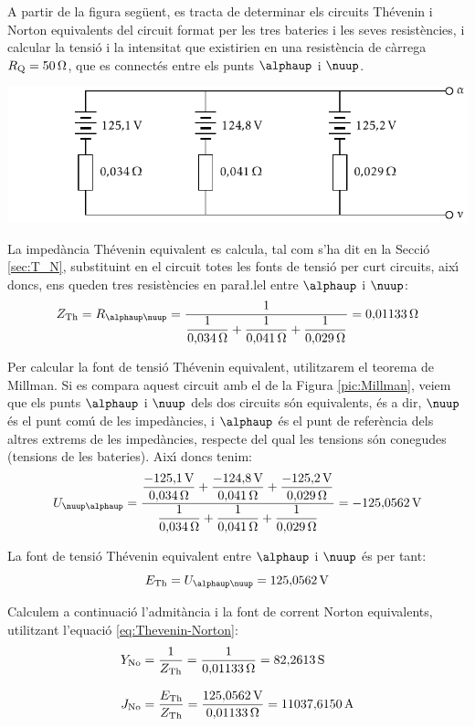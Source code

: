 \begin{exemple}
A partir de la figura seg\"{u}ent, es tracta de determinar els circuits
Th\'{e}venin i Norton equivalents del circuit format per les tres
bateries i les seves resist\`{e}ncies, i calcular la tensi\'{o} i la
intensitat que existirien en una resist\`{e}ncia de c\`{a}rrega
$R_\mathrm{Q}=50\mathrm{\,\mathrm{\Omega}}$, que es connect\'{e}s entre els punts $\alphaup$
i $\nuup$.

\includegraphics{Imatges/Cap-Fonaments-Millman-Exemple.pdf}

La imped\`{a}ncia Th\'{e}venin equivalent es calcula, tal com s'ha dit en la Secci\'{o} \ref{sec:T_N},
substituint en el circuit totes les fonts de tensi\'{o} per curt circuits, aix\'{\i} doncs, ens
queden tres resist\`{e}ncies en para{\l.l}el entre $\alphaup$ i $\nuup$:
\[
Z\ped{Th} = R_{\alphaup\nuup} =\frac{1}{\dfrac{1}{0{,}034\unit{\ohm}} +
\dfrac{1}{0{,}041\unit{\ohm}} + \dfrac{1}{0{,}029\unit{\ohm}}} =
0{,}01133\unit{\ohm}
\]

Per calcular la font de tensi\'{o} Th\'{e}venin equivalent, utilitzarem el
teorema de Millman. Si es compara aquest circuit amb el de la Figura
\vref{pic:Millman}, veiem que els punts $\alphaup$ i $\nuup$ dels dos
circuits s\'{o}n equivalents, \'{e}s a dir, $\nuup$ \'{e}s el punt com\'{u} de les
imped\`{a}ncies, i $\alphaup$ \'{e}s el punt de refer\`{e}ncia dels altres extrems
de les imped\`{a}ncies, respecte del qual les tensions s\'{o}n conegudes
(tensions de les bateries). Aix\'{\i} doncs tenim:
\[
U_{\nuup\alphaup} = \frac{\dfrac{-125{,}1\unit{V}}{0{,}034\unit{\ohm}} +
\dfrac{-124{,}8\unit{V}}{0{,}041\unit{\ohm}} +
\dfrac{-125{,}2\unit{V}}{0{,}029\unit{\ohm}}}{\dfrac{1}{0{,}034\unit{\ohm}}
+ \dfrac{1}{0{,}041\unit{\ohm}} + \dfrac{1}{0{,}029\unit{\ohm}}} =
-125{,}0562\unit{V}
\]

La font de tensi\'{o}  Th\'{e}venin equivalent entre $\alphaup$ i $\nuup$ \'{e}s per
tant:
\[
E\ped{Th} = U_{\alphaup\nuup} = 125{,}0562\unit{V}
\]

Calculem a continuaci\'{o} l'admit\`{a}ncia i la font de corrent  Norton equivalents, utilitzant
l'equaci\'{o} \eqref{eq:Thevenin-Norton}:
\begin{align*}
    Y_\mathrm{No} &= \frac{1}{Z_\mathrm{Th}} = \frac{1}{0{,}01133\mathrm{\,\mathrm{\Omega}}} = 82{,}2613\mathrm{\,S}
    \\[2ex]
    J_\mathrm{No} &= \frac{E_\mathrm{Th}}{Z_\mathrm{Th}} =
    \frac{125{,}0562\mathrm{\,V}}{0{,}01133\mathrm{\,\mathrm{\Omega}}}= 11037{,}6150\mathrm{\,A}
\end{align*}


\end{exemple}
